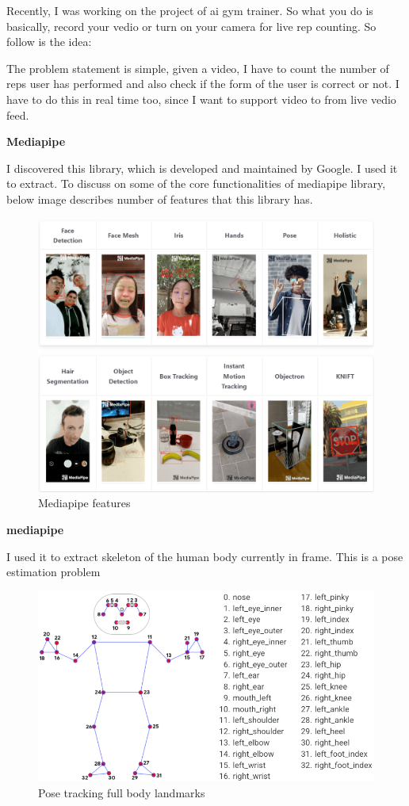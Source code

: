 Recently, I was working on the project of ai gym trainer. So what you do is basically, record your vedio or turn on your camera for live rep counting. So follow is the idea:

The problem statement is simple, given a video, I have to count the number of reps user has performed and also check if the form of the user is correct or not. I have to do this in real time too, since I want to support video to from live vedio feed.

\textbf{Mediapipe}

I discovered this library, which is developed and maintained by Google. I used it to extract. To discuss on some of the core functionalities of mediapipe library, below image describes number of features that this library has.

\begin{figure}[H]
    \centering
    \includegraphics[width=1.06\textwidth]{res/Mediapipe.png}
    \caption{Mediapipe features}
    \label{fig:2_mediapipe}
\end{figure}


\textbf{mediapipe}

I used it to extract skeleton of the human body currently in frame. This is a pose estimation problem


\begin{figure}[H]
    \centering
    \includegraphics[width=1.06\textwidth]{res/pose_tracking_full_body_landmarks.png}
    \caption{Pose tracking full body landmarks}
    \label{fig:2_mpose_landmarks}
\end{figure}

